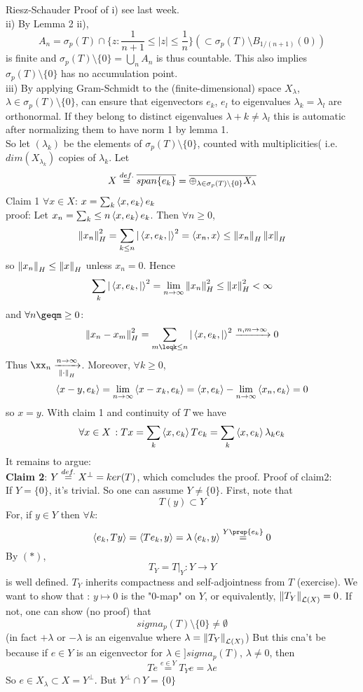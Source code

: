 \begin{pf}{Riesz-Schauder}{}
Proof of i) see last week.\\
ii) By Lemma 2 ii), 
$$A_n=\sigma_p(T)\cap\{z:\frac{1}{n+1}\leq|z|\leq\frac{1}{n}\}(\subset \sigma_p(T)\setminus B_{1/(n+1)}(0))$$
is finite and $\sigma_p(T)\setminus\{0\}=\bigcup_n A_n$ is thus countable. This also implies $\sigma_p(T)\setminus\{0\}$ has no accumulation point.\\
iii) By applying Gram-Schmidt to the (finite-dimensional) space $X_\lambda$, $\lambda\in\sigma_p(T)\setminus\{0\}$, can ensure that eigenvectors $e_k$, $e_l$ to eigenvalues $\lambda_k=\lambda_l$ are orthonormal. If they belong 
to distinct eigenvalues $\lambda+k\neq\lambda_l$ this is automatic after normalizing them to have norm 1 by lemma 1.\\
So let $(\lambda_k)$ be the elements of $\sigma_p(T)\setminus\{0\}$, counted with multiplicities( i.e. $dim(X_{\lambda_k})$ copies of $\lambda_k$. Let 
$$
X\stackrel{def.}{=}\overline{span\{e_k\}}=\overline{\oplus_{\lambda\in\sigma_p(T)\setminus\{0\}}X_\lambda}
$$
Claim 1 $\forall x\in X$: $x=\sum_k \left<{x},{e_k}\right>e_k$\\
proof: Let $x_n=\sum_k\leq n \left<{x},{e_k}\right>e_k$. 
Then $\forall n\geq0$,
$$
\left\|{x_n}\right\|_H^2=\sum_{k\leq n}|\left<{x,e_k},{|}\right>^2=\left<{x_n},{x}\right>\leq\left\|{x_n}\right\|_H\left\|{x}\right\|_H$$
so $\left\|{x_n}\right\|_H\leq\left\|{x}\right\|_H$ unless $x_n=0$. Hence
$$\sum_{k}|\left<{x,e_k},{|}\right>^2=\lim_{n\to\infty}\left\|{x_n}\right\|_H^2\leq\left\|{x}\right\|_H^2<\infty$$
and $\forall n\geqm\geq0$:
$$\norm{x_n-x_m}^2_H=\sum_{m\leqk\leq n}|\inne{x,e_k}|^2\xrightarrow{n,m\to\infty}0$$
Thus $\xx_n\xrightarrow[\norm{\cdot}_H]{n\to\infty}$. Moreover, $\forall k\geq 0$, 
$$\left<{x-y},{e_k}\right>=\lim_{n\to\infty}\left<{x-x_k},{e_k}\right>=\left<{x},{e_k}\right>-\lim_{n\to\infty}\left<{x_n},{e_k}\right>=0$$
so $x=y$. With claim 1 and continuity of $T$ we have
$$\forall x\in X\,: Tx=\sum_k \left<{x},{e_k}\right>Te_k=\sum_k \left<{x},{e_k}\right>\lambda_ke_k$$
It remains to argue:\\
{\bf Claim 2}: $Y\stackrel{def.}{=} X^\perp=ker(T)$, which comcludes the proof.
Proof of claim2:\\
If $Y=\{0\}$, it's trivial. So one can assume $Y\neq\{0\}$. First, note that 
\begin{equation}T(y)\subset Y\tag{$*$}\end{equation}
For, if $y\in Y$ then $\forall k$:
\[\inne{e_k}{Ty}=\inne{Te_k}{y}=\lambda\inne{e_k}{y}\stackrel{Y\prep\{e_k\}}{=}0\]
By $(*)$,
\[T_Y=T|_Y:Y\to Y\] is well defined. $T_Y$ inherits compactness and self-adjointness from $T$ (exercise). We want to show that : $y\mapsto0 $ is the  "0-map" on $Y$, or equivalently, $\left\|{T_Y}\right\|_{\mathcal{L}(X)}=0$. If not, one can show (no proof) that 
\[sigma_p(T)\setminus\{0\}\neq\emptyset\]
(in fact $+\lambda$ or $-\lambda$ is an eigenvalue where $\lambda=\left\|{T_Y}\right\|_{\mathcal{L}(X)}$) But this cna't be because if $e\in Y$ is an eigenvector for $\lambda\in]sigma_p(T)$, $\lambda\neq 0$, then 
\[Te\stackrel{e\in Y}{=}T_Y e=\lambda e\]
So $e\in X_\lambda\subset X=Y^\perp$. But $Y^\perp\cap Y=\{0\}$
\end{pf}

